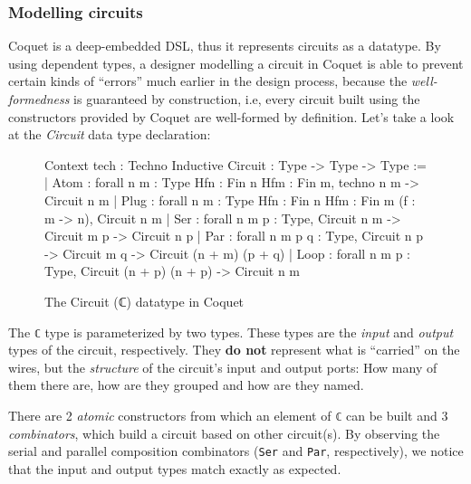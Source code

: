 \documentclass[a4paper]{article}
\begin{document}
            \subsubsection{Modelling circuits}
            \label{subsubsec:coquet-modelling}
                Coquet is a deep-embedded DSL, thus it represents circuits as a datatype. By using
                dependent types, a designer modelling a circuit in Coquet is able to prevent certain
                kinds of ``errors'' much earlier in the design process, because the
                \emph{well-formedness} is guaranteed by construction, i.e, every circuit built using
                the constructors provided by Coquet are well-formed by definition. Let's take a look
                at the \emph{Circuit} data type declaration:
                \begin{figure}[h!]
                    \begin{center}
                        \begin{coqcode}
        Context {tech : Techno}
        Inductive Circuit : Type -> Type -> Type :=
        | Atom : forall {n m : Type} {Hfn : Fin n} {Hfm : Fin m}, techno n m -> Circuit n m
        | Plug : forall {n m : Type} {Hfn : Fin n} {Hfm : Fin m} (f : m -> n), Circuit n m
        | Ser : forall {n m p : Type}, Circuit n m -> Circuit m p -> Circuit n p
        | Par : forall {n m p q : Type}, Circuit n p -> Circuit m q -> Circuit (n + m) (p + q)
        | Loop : forall {n m p : Type}, Circuit (n + p) (n + p) -> Circuit n m
                        \end{coqcode}
                    \end{center}
                    \caption{The Circuit (ℂ) datatype in Coquet
                        \label{fig:coquet-circuit-type}}
                \end{figure}

                The \texttt{ℂ} type is parameterized by two types. These types are the \emph{input} and
                \emph{output} types of the circuit, respectively. They \textbf{do not} represent
                what is ``carried'' on the wires, but the \emph{structure} of the circuit's input
                and output ports: How many of them there are, how are they grouped and how are they
                named.

                There are 2 \emph{atomic} constructors from which an element of \texttt{ℂ} can be
                built and 3 \emph{combinators}, which build a circuit based on other circuit(s). By
                observing the serial and parallel composition combinators (\texttt{Ser} and
                \texttt{Par}, respectively), we notice that the input and output types match exactly
                as expected.
\end{document}
